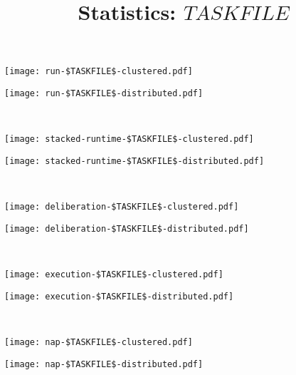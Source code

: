 \documentclass[11pt,a4paper]{article}
\title{Statistics: $TASKFILE$}
\author{}
\date{}
\begin{document}
\maketitle

\noindent
\begin{minipage}{0.5\textwidth}
\texttt{[image: run-\$TASKFILE\$-clustered.pdf]}
\end{minipage}
\begin{minipage}{0.5\textwidth}
\texttt{[image: run-\$TASKFILE\$-distributed.pdf]}
\end{minipage}
\\[0.2cm]

\noindent
\begin{minipage}{0.5\textwidth}
\texttt{[image: stacked-runtime-\$TASKFILE\$-clustered.pdf]}
\end{minipage}
\begin{minipage}{0.5\textwidth}
\texttt{[image: stacked-runtime-\$TASKFILE\$-distributed.pdf]}
\end{minipage}
\\[0.2cm]

\noindent
\begin{minipage}{0.5\textwidth}
\texttt{[image: deliberation-\$TASKFILE\$-clustered.pdf]}
\end{minipage}
\begin{minipage}{0.5\textwidth}
\texttt{[image: deliberation-\$TASKFILE\$-distributed.pdf]}
\end{minipage}
\\[0.2cm]

\noindent
\begin{minipage}{0.5\textwidth}
\texttt{[image: execution-\$TASKFILE\$-clustered.pdf]}
\end{minipage}
\begin{minipage}{0.5\textwidth}
\texttt{[image: execution-\$TASKFILE\$-distributed.pdf]}
\end{minipage}
\\[0.2cm]

\noindent
\begin{minipage}{0.5\textwidth}
\texttt{[image: nap-\$TASKFILE\$-clustered.pdf]}
\end{minipage}
\begin{minipage}{0.5\textwidth}
\texttt{[image: nap-\$TASKFILE\$-distributed.pdf]}
\end{minipage}
\\[0.2cm]
\end{document}
